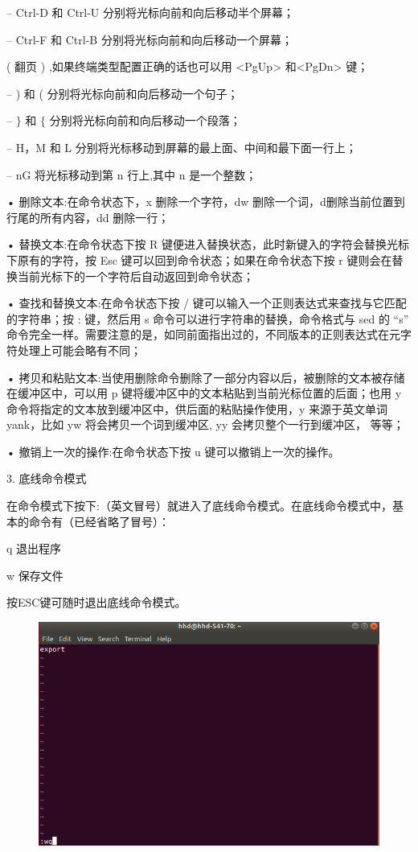 \documentclass[12pt,a4paper]{article}
\begin{document}
– Ctrl-D 和 Ctrl-U 分别将光标向前和向后移动半个屏幕；

– Ctrl-F 和 Ctrl-B 分别将光标向前和向后移动一个屏幕；

( 翻页 ) ,如果终端类型配置正确的话也可以用 <PgUp> 和<PgDn> 键；

– ) 和 ( 分别将光标向前和向后移动一个句子；

– $\rbrace$ 和 $\lbrace$ 分别将光标向前和向后移动一个段落；

– H，M 和 L 分别将光标移动到屏幕的最上面、中间和最下面一行上；

– nG 将光标移动到第 n 行上,其中 n 是一个整数；

• 删除文本:在命令状态下，x 删除一个字符，dw 删除一个词，d删除当前位置到行尾的所有内容，dd 删除一行；

• 替换文本:在命令状态下按 R 键便进入替换状态，此时新键入的字符会替换光标下原有的字符，按 Esc 键可以回到命令状态；如果在命令状态下按 r 键则会在替换当前光标下的一个字符后自动返回到命令状态；

• 查找和替换文本:在命令状态下按 / 键可以输入一个正则表达式来查找与它匹配的字符串；按 : 键，然后用 s 命令可以进行字符串的替换，命令格式与 sed 的 “s” 命令完全一样。需要注意的是，如同前面指出过的，不同版本的正则表达式在元字符处理上可能会略有不同；

• 拷贝和粘贴文本:当使用删除命令删除了一部分内容以后，被删除的文本被存储在缓冲区中，可以用 p 键将缓冲区中的文本粘贴到当前光标位置的后面；也用 y 命令将指定的文本放到缓冲区中，供后面的粘贴操作使用，y 来源于英文单词 yank，比如 yw 将会拷贝一个词到缓冲区, yy 会拷贝整个一行到缓冲区，
等等；

• 撤销上一次的操作:在命令状态下按 u 键可以撤销上一次的操作。

3. 底线命令模式

在命令模式下按下:（英文冒号）就进入了底线命令模式。在底线命令模式中，基本的命令有（已经省略了冒号）：

q 退出程序

w 保存文件

按ESC键可随时退出底线命令模式。
\begin{figure}[H]
\centering
\includegraphics[scale=0.5]{./figures/10.png}
\caption{}
\end{figure}
\end{document}
